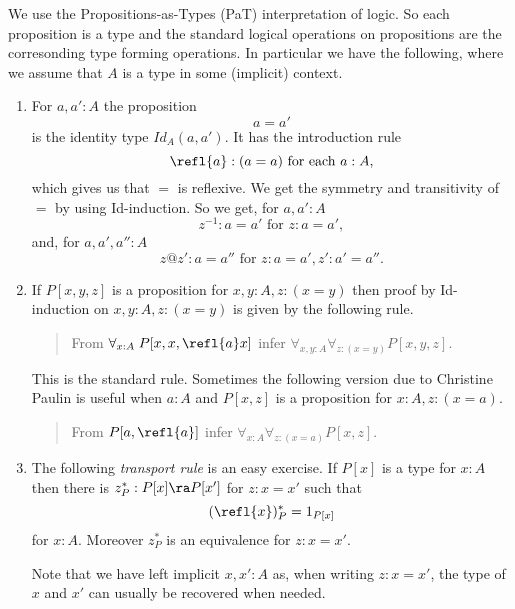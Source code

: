 \begin{notes}[Identity] 
We use the Propositions-as-Types (PaT) interpretation of logic.  So each proposition is a type and the standard logical operations on propositions are the corresonding type forming operations.  In particular we have the following, where we assume that $A$ is a type in some (implicit) context.
\begin{enumerate}
\item For $a,a':A$ the proposition 
  \[ a=a'\] 
is the identity type $Id_A(a,a')$.  It has the introduction rule 
  \[\refl{a}:(a=a) \mbox{ for each $a:A$},\]
which gives us that $=$ is reflexive.  We get the symmetry and transitivity of $=$ by using Id-induction.  So we get, for $a,a':A$
  \[ z^{-1}:a=a'\mbox{ for } z:a=a',\]
and, for $a,a',a'':A$
  \[ z@z':a=a''\mbox{ for $z:a=a',z':a'=a''$}.\]

\item If $P[x,y,z]$ is a proposition for $x,y:A,z:(x=y)$ then proof by Id-induction on
 $x,y:A,z:(x=y)$ is given by the following rule.
\begin{quote}
From $\forall_{x:A}\; P[x,x,\refl{a}x]$ infer $\forall_{x,y:A}\forall_{z:(x=y)}P[x,y,z]$.  
\end{quote}
This is the standard rule.  Sometimes the following version due to Christine Paulin is useful when $a:A$ and $P[x,z]$ is a proposition for $x:A,z:(x=a)$.
\begin{quote}
From $P[a,\refl{a}]$ infer $\forall_{x:A}\forall_{z:(x=a)}P[x,z]$.
\end{quote}

\item The following {\em transport rule} is an easy exercise.
If $P[x]$ is a type for $x:A$ then there is $z^*_P:P[x]\ra P[x']$ for $z:x=x'$ such that
  \[ (\refl{x})^*_P = 1_{P[x]}\] 
for $x:A$.  Moreover $z^*_P$ is an equivalence for $z:x=x'$.

Note that we have left implicit $x,x':A$ as, when writing $z:x=x'$, the type of $x$ and $x'$ can usually be recovered when needed.
\end{enumerate}
\end{notes}

